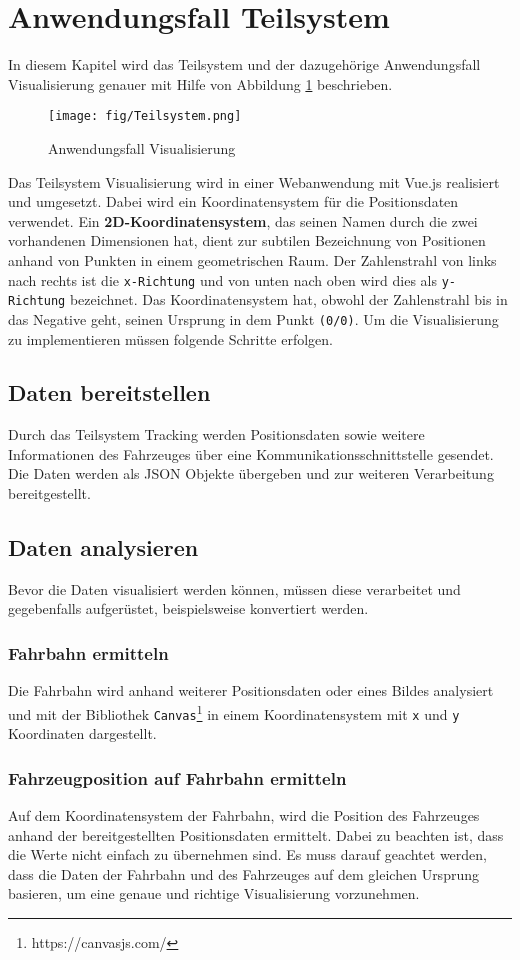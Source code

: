 \section{Anwendungsfall Teilsystem}
In diesem Kapitel wird das Teilsystem und der dazugeh\"orige Anwendungsfall Visualisierung genauer mit Hilfe von Abbildung \ref{fig:Visu} beschrieben.
\begin{figure}[H] 
\centering
\texttt{[image: fig/Teilsystem.png]} 
\caption{Anwendungsfall Visualisierung}
\label{fig:Visu}
\end{figure} 
Das Teilsystem Visualisierung wird in einer Webanwendung mit Vue.js realisiert und umgesetzt. Dabei wird ein Koordinatensystem f\"ur die Positionsdaten verwendet. Ein \textbf{2D-Koordinatensystem}, das seinen Namen durch die zwei vorhandenen Dimensionen hat, dient zur subtilen Bezeichnung von Positionen anhand von Punkten in einem geometrischen Raum. Der Zahlenstrahl von links nach rechts ist die \texttt{x-Richtung} und von unten nach oben wird dies als \texttt{y-Richtung} bezeichnet. Das Koordinatensystem hat, obwohl der Zahlenstrahl bis in das Negative geht, seinen Ursprung in dem Punkt \texttt{(0/0)}\cite{Rudolph2017}. Um die Visualisierung zu implementieren m\"ussen folgende Schritte erfolgen.
\subsection*{Daten bereitstellen}
Durch das Teilsystem Tracking werden Positionsdaten sowie weitere Informationen des Fahrzeuges \"uber eine Kommunikationsschnittstelle gesendet. Die Daten werden als \ac{JSON}  Objekte \"ubergeben und zur weiteren Verarbeitung bereitgestellt.
\subsection*{Daten analysieren}
Bevor die Daten visualisiert werden k\"onnen, m\"ussen diese verarbeitet und gegebenfalls aufger\"ustet, beispielsweise konvertiert werden.
\subsubsection*{Fahrbahn ermitteln}
Die Fahrbahn wird anhand weiterer Positionsdaten oder eines Bildes analysiert und mit der Bibliothek \texttt{Canvas}\footnote{https://canvasjs.com/} in einem Koordinatensystem mit \texttt{x} und \texttt{y} Koordinaten dargestellt. 
\subsubsection*{Fahrzeugposition auf Fahrbahn ermitteln}
Auf dem Koordinatensystem der Fahrbahn, wird die Position des Fahrzeuges anhand der bereitgestellten Positionsdaten ermittelt. Dabei zu beachten ist, dass die Werte nicht einfach zu \"ubernehmen sind. Es muss darauf geachtet werden, dass die Daten der Fahrbahn und des Fahrzeuges auf dem gleichen Ursprung basieren, um eine genaue und richtige Visualisierung vorzunehmen.
